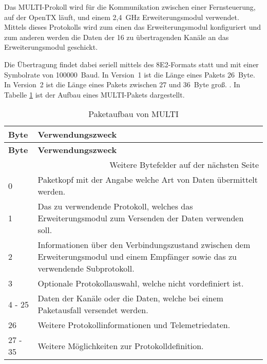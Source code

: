 Das MULTI-Prokoll wird für die Kommunikation zwischen einer Fernsteuerung, auf der OpenTX läuft, und einem 2,4~GHz Erweiterungsmodul verwendet. Mittels dieses Protokolls wird zum einen das Erweiterungsmodul konfiguriert und zum anderen werden die Daten der 16 zu übertragenden Kanäle an das Erweiterungsmodul geschickt. \cites{langerTransmitter}{langerMultiprotocol}

Die Übertragung findet dabei seriell mittels des 8E2-Formats statt und mit einer Symbolrate von 100000~Baud. In Version~1 ist die Länge eines Pakets 26~Byte. In Version~2 ist die Länge eines Pakets zwischen 27 und 36~Byte groß. \cite{langerMultiprotocol}. In Tabelle \ref{table:mutliPaket} ist der Aufbau eines MULTI-Pakets dargestellt.

\begin{longtable}[c]{|p{2cm}|p{13cm}|}
    \caption{Paketaufbau von MULTI \cite{langerMultiprotocol}}
    \label{table:mutliPaket}\\
    \hline
    \textbf{Byte} & \textbf{Verwendungszweck}\\
    \hline
    \hline
    \endfirsthead

    \hline
    \textbf{Byte} & \textbf{Verwendungszweck}\\
    \hline
    \hline
    \endhead

    \hline
    \multicolumn{2}{|r|}{Weitere Bytefelder auf der nächsten Seite}\\
    \hline
    \endfoot

    \hline
    \endlastfoot
    
    0 & Paketkopf mit der Angabe welche Art von Daten übermittelt werden. \\
    \hline
    1 & Das zu verwendende Protokoll, welches das Erweiterungsmodul zum Versenden der Daten verwenden soll. \\
    \hline
    2 & Informationen über den Verbindungszustand zwischen dem Erweiterungsmodul und einem Empfänger sowie das zu verwendende Subprotokoll. \\
    \hline
    3 & Optionale Protokollauswahl, welche nicht vordefiniert ist. \\
    \hline
    4 - 25 & Daten der Kanäle oder die Daten, welche bei einem Paketausfall versendet werden. \\
    \hline
    26 & Weitere Protokollinformationen und Telemetriedaten. \\
    \hline
    27 - 35 & Weitere Möglichkeiten zur Protokolldefinition. \\
\end{longtable}

